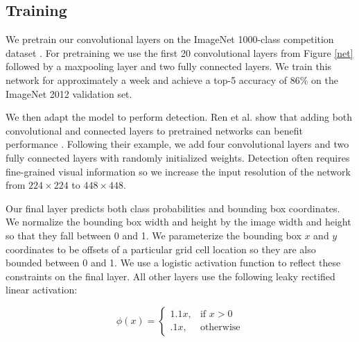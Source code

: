 \documentclass{article} %
\begin{document}
\subsection{Training}
%

We pretrain our convolutional layers on the ImageNet 1000-class competition dataset \cite{ILSVRC15}. For pretraining we use the first 20 convolutional layers from Figure \ref{net} followed by a maxpooling layer and two fully connected layers. We train this network for approximately a week and achieve a top-5 accuracy of 86\% on the ImageNet 2012 validation set.

We then adapt the model to perform detection. Ren et al. show that adding both convolutional and connected layers to pretrained networks can benefit performance \cite{DBLP:journals/corr/RenHGZ015}. Following their example, we add four convolutional layers and two fully connected layers with randomly initialized weights. Detection often requires fine-grained visual information so we increase the input resolution of the network from $224 \times 224$ to $448 \times 448$.

Our final layer predicts both class probabilities and bounding box coordinates. We normalize the bounding box width and height by the image width and height so that they fall between 0 and 1. We parameterize the bounding box $x$ and $y$ coordinates to be offsets of a particular grid cell location so they are also bounded between 0 and 1. We use a logistic activation function to reflect these constraints on the final layer. All other layers use the following leaky rectified linear activation:

\begin{equation}
\phi(x) =
\begin{cases}
    1.1x, & \text{if } x > 0\\
    .1x, & \text{otherwise}
    \end{cases}
\end{equation}
\end{document}
